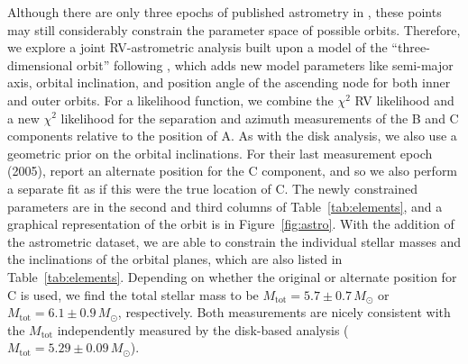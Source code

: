 \documentclass[twocolumn]{aastex61}
\begin{document}
Although there are only three epochs of published astrometry in \citet{berger11}, these points may still considerably constrain the parameter space of possible orbits. Therefore, we explore a joint RV-astrometric analysis built upon a model of the ``three-dimensional orbit'' following \citet{murray10}, which adds new model parameters like semi-major axis, orbital inclination, and position angle of the ascending node for both inner and outer orbits. For a likelihood function, we combine the $\chi^2$ RV likelihood and a new $\chi^2$ likelihood for the separation and azimuth measurements of the B and C components relative to the position of A. As with the disk analysis, we also use a geometric prior on the orbital inclinations. For their last measurement epoch (2005), \citet{berger11} report an alternate position for the C component, and so we also perform a separate fit as if this were the true location of C.
The newly constrained parameters are in the second and third columns of Table~\ref{tab:elements}, and a graphical representation of the orbit is in Figure~\ref{fig:astro}.
With the addition of the astrometric dataset, we are able to constrain the individual stellar masses and the inclinations of the orbital planes, which are also listed in Table~\ref{tab:elements}. Depending on whether the original or alternate position for C is used, we find the total stellar mass to be $M_\mathrm{tot} = 5.7 \pm 0.7\,M_\odot$ or $M_\mathrm{tot} = 6.1 \pm 0.9\,M_\odot$, respectively. Both measurements are nicely consistent with the $M_\mathrm{tot}$ independently measured by the disk-based analysis ($M_\mathrm{tot} = 5.29 \pm 0.09\,M_\odot$).
\end{document}
